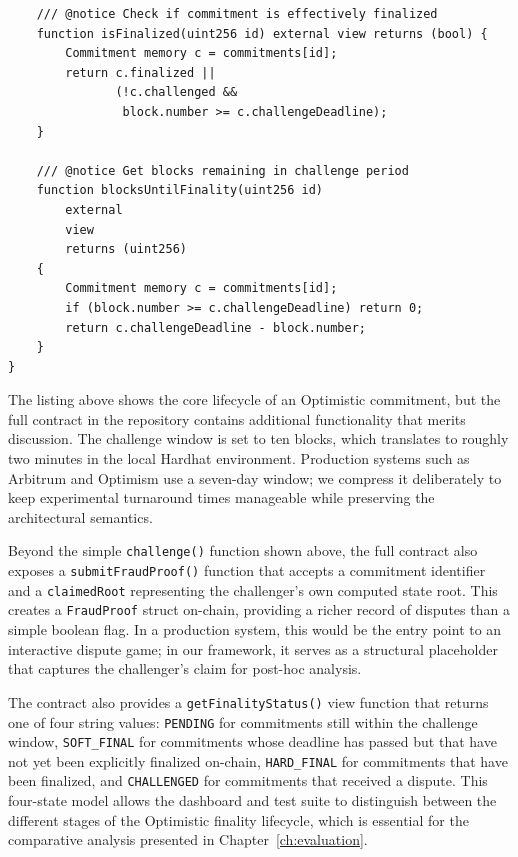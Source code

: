 \begin{listing}[H]
\begin{verbatim}
    /// @notice Check if commitment is effectively finalized
    function isFinalized(uint256 id) external view returns (bool) {
        Commitment memory c = commitments[id];
        return c.finalized || 
               (!c.challenged && 
                block.number >= c.challengeDeadline);
    }

    /// @notice Get blocks remaining in challenge period
    function blocksUntilFinality(uint256 id) 
        external 
        view 
        returns (uint256) 
    {
        Commitment memory c = commitments[id];
        if (block.number >= c.challengeDeadline) return 0;
        return c.challengeDeadline - block.number;
    }
}
    \end{verbatim}
    \caption{OptimisticVerifier.sol - Optimistic contract implementation}
    \label{lst:optverifier}
\end{listing}

The listing above shows the core lifecycle of an Optimistic commitment, but the full contract in the repository contains additional functionality that merits discussion. The challenge window is set to ten blocks, which translates to roughly two minutes in the local Hardhat environment. Production systems such as Arbitrum and Optimism use a seven-day window; we compress it deliberately to keep experimental turnaround times manageable while preserving the architectural semantics.

Beyond the simple \texttt{challenge()} function shown above, the full contract also exposes a \texttt{submitFraudProof()} function that accepts a commitment identifier and a \texttt{claimedRoot} representing the challenger's own computed state root. This creates a \texttt{FraudProof} struct on-chain, providing a richer record of disputes than a simple boolean flag. In a production system, this would be the entry point to an interactive dispute game; in our framework, it serves as a structural placeholder that captures the challenger's claim for post-hoc analysis.

The contract also provides a \texttt{getFinalityStatus()} view function that returns one of four string values: \texttt{PENDING} for commitments still within the challenge window, \texttt{SOFT\_FINAL} for commitments whose deadline has passed but that have not yet been explicitly finalized on-chain, \texttt{HARD\_FINAL} for commitments that have been finalized, and \texttt{CHALLENGED} for commitments that received a dispute. This four-state model allows the dashboard and test suite to distinguish between the different stages of the Optimistic finality lifecycle, which is essential for the comparative analysis presented in Chapter~\ref{ch:evaluation}.

